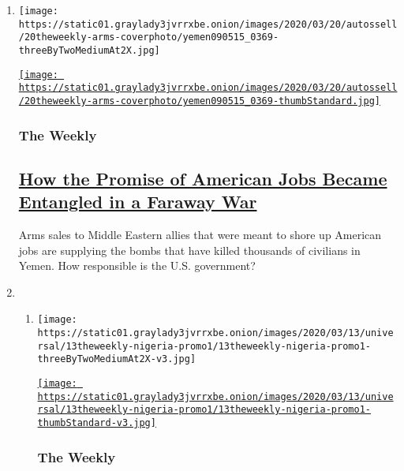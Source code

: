 \begin{enumerate}
\def\labelenumi{\arabic{enumi}.}
\item
  \texttt{[image: https://static01.graylady3jvrrxbe.onion/images/2020/03/20/autossell/20theweekly-arms-coverphoto/yemen090515\_0369-threeByTwoMediumAt2X.jpg]}

  \href{/2020/03/20/the-weekly/saudi-arabia-yemen-raytheon.html}{\texttt{[image: https://static01.graylady3jvrrxbe.onion/images/2020/03/20/autossell/20theweekly-arms-coverphoto/yemen090515\_0369-thumbStandard.jpg]}}

  \hypertarget{the-weekly-1}{%
  \subsubsection{The Weekly}\label{the-weekly-1}}

  \hypertarget{how-the-promise-of-american-jobs-became-entangled-in-a-faraway-war}{%
  \subsection{\texorpdfstring{\href{/2020/03/20/the-weekly/saudi-arabia-yemen-raytheon.html}{How
  the Promise of American Jobs Became Entangled in a Faraway
  War}}{How the Promise of American Jobs Became Entangled in a Faraway War}}\label{how-the-promise-of-american-jobs-became-entangled-in-a-faraway-war}}

  Arms sales to Middle Eastern allies that were meant to shore up
  American jobs are supplying the bombs that have killed thousands of
  civilians in Yemen. How responsible is the U.S. government?
\item
  \begin{enumerate}
  \def\labelenumii{\arabic{enumii}.}
  \item
    \texttt{[image: https://static01.graylady3jvrrxbe.onion/images/2020/03/13/universal/13theweekly-nigeria-promo1/13theweekly-nigeria-promo1-threeByTwoMediumAt2X-v3.jpg]}

    \href{/2020/03/13/the-weekly/nigeria-boko-haram-girls-kidnapping.html}{\texttt{[image: https://static01.graylady3jvrrxbe.onion/images/2020/03/13/universal/13theweekly-nigeria-promo1/13theweekly-nigeria-promo1-thumbStandard-v3.jpg]}}

    \hypertarget{the-weekly-2}{%
    \subsubsection{The Weekly}\label{the-weekly-2}}


\end{enumerate}
\end{enumerate}
